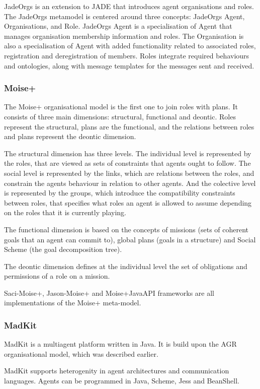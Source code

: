 \documentclass{article}
\begin{document}
JadeOrgs is an extension to JADE that introduces agent organisations
and roles. The JadeOrgs metamodel is centered around three concepts:
JadeOrgs Agent, Organisations, and Role. JadeOrgs Agent is a
specialisation of Agent that manages organisation membership
information and roles. The Organisation is also a specialisation
of Agent with added functionality related to associated roles,
registration and deregistration of members. Roles integrate required
behaviours and ontologies, along with message templates for the
messages sent and received.

\subsubsection{Moise+} The Moise+ organisational model is the first
one to join roles with plans. It consists of three main dimensions:
structural, functional and deontic. Roles represent the structural,
plans are the functional, and the relations between roles and plans
represent the deontic dimension.

The structural dimension has three levels. The individual level is
represented by the roles, that are viewed as sets of constraints
that agents ought to follow. The social level is represented by the
links, which are relations between the roles, and constrain the
agents behaviour in relation to other agents. And the colective level
is represented by the groups, which introduce the compatibility
constraints between roles, that specifies what roles an agent is
allowed to assume depending on the roles that it is currently playing.

The functional dimension is based on the concepts of missions (sets of
coherent goals that an agent can commit to), global plans (goals in a
structure) and Social Scheme (the goal decomposition tree).

The deontic dimension defines at the individual level the set of
obligations and permissions of a role on a mission.

Saci-Moise+, Jason-Moise+ and Moise+JavaAPI frameworks are all
implementations of the Moise+ meta-model.

\subsubsection{MadKit} MadKit is a multiagent platform written in
Java. It is build upon the AGR organisational model, which was
described earlier.

MadKit supports heterogenity in agent architectures and communication
languages. Agents can be programmed in Java, Scheme, Jess and
BeanShell.
\end{document}
